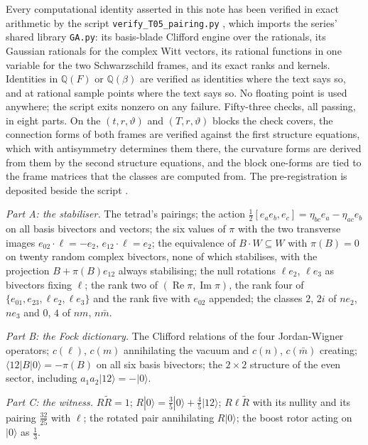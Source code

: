 \documentclass[11pt]{article}
\theoremstyle{definition}
\theoremstyle{plain}
\providecommand{\Q}{}\renewcommand{\Q}{\mathbb{Q}}
\providecommand{\mb}{}\renewcommand{\mb}{\bar m}
\providecommand{\pv}{}\renewcommand{\pv}{\pi}
\providecommand{\bra}{}\renewcommand{\bra}[1]{\langle #1|}
\providecommand{\ket}{}\renewcommand{\ket}[1]{|#1\rangle}
\begin{document}
\label{c:note.pairing.setting-machine-verification}
Every computational identity asserted in this note has been verified in exact arithmetic by the script \texttt{verify\_T05\_pairing.py} \cite{ButlerVerifyT05pairing}, which imports the series' shared library \texttt{GA.py}: its basis-blade Clifford engine over the rationals, its Gaussian rationals for the complex Witt vectors, its rational functions in one variable for the two Schwarzschild frames, and its exact ranks and kernels. Identities in $\Q(F)$ or $\Q(\beta)$ are verified as identities where the text says so, and at rational sample points where the text says so. No floating point is used anywhere; the script exits nonzero on any failure. Fifty-three checks, all passing, in eight parts. On the $(t, r, \vartheta)$ and $(T, r, \vartheta)$ blocks the check covers, the connection forms of both frames are verified against the first structure equations, which with antisymmetry determines them there, the curvature forms are derived from them by the second structure equations, and the block one-forms are tied to the frame matrices that the classes are computed from. The pre-registration is deposited beside the script \cite{ButlerPreregT05pairing}.

\emph{Part A: the stabiliser.} The tetrad's pairings; the action $\tfrac12[e_{a}e_{b}, e_{c}] = \eta_{bc}e_{a} - \eta_{ac}e_{b}$ on all basis bivectors and vectors; the six values of $\pv$ with the two transverse images $e_{02}\cdot\ell = -e_{2}$, $e_{12}\cdot\ell = e_{2}$; the equivalence of $B\cdot W \subseteq W$ with $\pv(B) = 0$ on twenty random complex bivectors, none of which stabilises, with the projection $B + \pv(B)e_{12}$ always stabilising; the null rotations $\ell e_{2}$, $\ell e_{3}$ as bivectors fixing $\ell$; the rank two of $(\operatorname{Re}\pv, \operatorname{Im}\pv)$, the rank four of $\{e_{01}, e_{23}, \ell e_{2}, \ell e_{3}\}$ and the rank five with $e_{02}$ appended; the classes $2$, $2i$ of $ne_{2}$, $ne_{3}$ and $0$, $4$ of $n m$, $n\mb$.

\emph{Part B: the Fock dictionary.} The Clifford relations of the four Jordan-Wigner operators; $c(\ell)$, $c(m)$ annihilating the vacuum and $c(n)$, $c(\mb)$ creating; $\bra{12}B\ket{0} = -\pv(B)$ on all six basis bivectors; the $2 \times 2$ structure of the even sector, including $a_{1}a_{2}\ket{12} = -\ket{0}$.

\emph{Part C: the witness.} $R\tilde R = 1$; $R\ket{0} = \tfrac35\ket{0} + \tfrac45\ket{12}$; $R\ell\tilde R$ with its nullity and its pairing $\tfrac{32}{25}$ with $\ell$; the rotated pair annihilating $R\ket{0}$; the boost rotor acting on $\ket{0}$ as $\tfrac13$.
\end{document}
